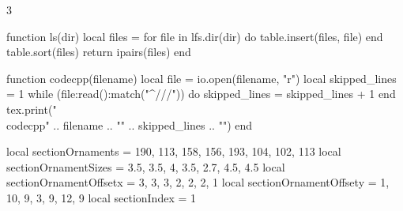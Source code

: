 \documentclass[8pt,a4paper,landscape,oneside]{amsart}
\newcommand{\codecpp}[2]{\inputminted[firstline=#2]{cpp}{\detokenize{#1}}}
\begin{document}
\begin{multicols*}{3}
\begin{luacode*}

function ls(dir)
    local files = {}
    for file in lfs.dir(dir) do
        table.insert(files, file)
    end
    table.sort(files)
    return ipairs(files)
end

function codecpp(filename)
    local file = io.open(filename, "r")
    local skipped_lines = 1
    while (file:read():match("^///")) do
        skipped_lines = skipped_lines + 1
    end
    tex.print("\\codecpp{" .. filename .. "}{" .. skipped_lines .. "}")
end

local sectionOrnaments = {190, 113, 158, 156, 193, 104, 102, 113}
local sectionOrnamentSizes = {3.5, 3.5, 4, 3.5, 2.7, 4.5, 4.5}
local sectionOrnamentOffsetx = {3, 3, 3, 2, 2, 2, 1}
local sectionOrnamentOffsety = {1, 10, 9, 3, 9, 12, 9}
local sectionIndex = 1


\end{luacode*}
\end{multicols*}
\end{document}

